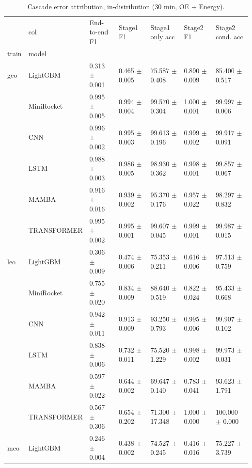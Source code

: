 \begin{table}
\centering
\caption{Cascade error attribution, in-distribution (30 min, OE + Energy).}
\label{tab:cascade}
\begin{tabular}{lllllll}
\toprule
    & col &      End-to-end F1 &          Stage1 F1 &      Stage1 only acc &          Stage2 F1 &     Stage2 cond. acc \\
train & model &                    &                    &                      &                    &                      \\
\midrule
geo & LightGBM &  0.313 $\pm$ 0.001 &  0.465 $\pm$ 0.005 &   75.587 $\pm$ 0.408 &  0.890 $\pm$ 0.009 &   85.400 $\pm$ 0.517 \\
    & MiniRocket &  0.995 $\pm$ 0.005 &  0.994 $\pm$ 0.004 &   99.570 $\pm$ 0.304 &  1.000 $\pm$ 0.001 &   99.997 $\pm$ 0.006 \\
    & CNN &  0.996 $\pm$ 0.002 &  0.995 $\pm$ 0.003 &   99.613 $\pm$ 0.196 &  0.999 $\pm$ 0.002 &   99.917 $\pm$ 0.091 \\
    & LSTM &  0.988 $\pm$ 0.003 &  0.986 $\pm$ 0.005 &   98.930 $\pm$ 0.362 &  0.998 $\pm$ 0.001 &   99.857 $\pm$ 0.067 \\
    & MAMBA &  0.916 $\pm$ 0.016 &  0.939 $\pm$ 0.002 &   95.370 $\pm$ 0.176 &  0.957 $\pm$ 0.022 &   98.297 $\pm$ 0.832 \\
    & TRANSFORMER &  0.995 $\pm$ 0.002 &  0.995 $\pm$ 0.001 &   99.607 $\pm$ 0.045 &  0.999 $\pm$ 0.001 &   99.987 $\pm$ 0.015 \\
leo & LightGBM &  0.306 $\pm$ 0.009 &  0.474 $\pm$ 0.006 &   75.353 $\pm$ 0.211 &  0.616 $\pm$ 0.006 &   97.513 $\pm$ 0.759 \\
    & MiniRocket &  0.755 $\pm$ 0.020 &  0.834 $\pm$ 0.009 &   88.640 $\pm$ 0.519 &  0.822 $\pm$ 0.024 &   95.433 $\pm$ 0.668 \\
    & CNN &  0.942 $\pm$ 0.011 &  0.913 $\pm$ 0.009 &   93.250 $\pm$ 0.793 &  0.995 $\pm$ 0.006 &   99.907 $\pm$ 0.102 \\
    & LSTM &  0.838 $\pm$ 0.006 &  0.732 $\pm$ 0.011 &   75.520 $\pm$ 1.229 &  0.998 $\pm$ 0.002 &   99.973 $\pm$ 0.031 \\
    & MAMBA &  0.597 $\pm$ 0.022 &  0.644 $\pm$ 0.002 &   69.647 $\pm$ 0.140 &  0.783 $\pm$ 0.041 &   93.623 $\pm$ 1.791 \\
    & TRANSFORMER &  0.567 $\pm$ 0.306 &  0.654 $\pm$ 0.202 &  71.300 $\pm$ 17.348 &  1.000 $\pm$ 0.000 &  100.000 $\pm$ 0.000 \\
meo & LightGBM &  0.246 $\pm$ 0.004 &  0.438 $\pm$ 0.002 &   74.527 $\pm$ 0.245 &  0.416 $\pm$ 0.016 &   75.227 $\pm$ 3.739 \\

\end{tabular}
\end{table}
